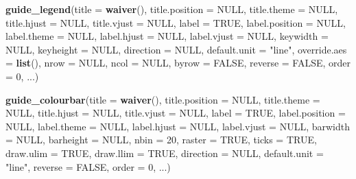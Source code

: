 \documentclass[]{book}
\newenvironment{Shaded}{\begin{snugshade}}{\end{snugshade}}
\newcommand{\KeywordTok}[1]{\textcolor[rgb]{0.13,0.29,0.53}{\textbf{#1}}}
\newcommand{\DataTypeTok}[1]{\textcolor[rgb]{0.13,0.29,0.53}{#1}}
\newcommand{\DecValTok}[1]{\textcolor[rgb]{0.00,0.00,0.81}{#1}}
\newcommand{\StringTok}[1]{\textcolor[rgb]{0.31,0.60,0.02}{#1}}
\newcommand{\OtherTok}[1]{\textcolor[rgb]{0.56,0.35,0.01}{#1}}
\newcommand{\NormalTok}[1]{#1}
\begin{document}
\begin{Shaded}
\begin{Highlighting}[]
\KeywordTok{guide_legend}\NormalTok{(}\DataTypeTok{title =} \KeywordTok{waiver}\NormalTok{(), }\DataTypeTok{title.position =} \OtherTok{NULL}\NormalTok{, }\DataTypeTok{title.theme =} \OtherTok{NULL}\NormalTok{,}
             \DataTypeTok{title.hjust =} \OtherTok{NULL}\NormalTok{, }\DataTypeTok{title.vjust =} \OtherTok{NULL}\NormalTok{, }\DataTypeTok{label =} \OtherTok{TRUE}\NormalTok{,}
             \DataTypeTok{label.position =} \OtherTok{NULL}\NormalTok{, }\DataTypeTok{label.theme =} \OtherTok{NULL}\NormalTok{, }\DataTypeTok{label.hjust =} \OtherTok{NULL}\NormalTok{,}
             \DataTypeTok{label.vjust =} \OtherTok{NULL}\NormalTok{, }\DataTypeTok{keywidth =} \OtherTok{NULL}\NormalTok{, }\DataTypeTok{keyheight =} \OtherTok{NULL}\NormalTok{,}
             \DataTypeTok{direction =} \OtherTok{NULL}\NormalTok{, }\DataTypeTok{default.unit =} \StringTok{"line"}\NormalTok{, }\DataTypeTok{override.aes =} \KeywordTok{list}\NormalTok{(),}
             \DataTypeTok{nrow =} \OtherTok{NULL}\NormalTok{, }\DataTypeTok{ncol =} \OtherTok{NULL}\NormalTok{, }\DataTypeTok{byrow =} \OtherTok{FALSE}\NormalTok{, }\DataTypeTok{reverse =} \OtherTok{FALSE}\NormalTok{, }\DataTypeTok{order =} \DecValTok{0}\NormalTok{, ...)}

\KeywordTok{guide_colourbar}\NormalTok{(}\DataTypeTok{title =} \KeywordTok{waiver}\NormalTok{(), }\DataTypeTok{title.position =} \OtherTok{NULL}\NormalTok{, }\DataTypeTok{title.theme =} \OtherTok{NULL}\NormalTok{,}
                \DataTypeTok{title.hjust =} \OtherTok{NULL}\NormalTok{, }\DataTypeTok{title.vjust =} \OtherTok{NULL}\NormalTok{, }\DataTypeTok{label =} \OtherTok{TRUE}\NormalTok{,}
                \DataTypeTok{label.position =} \OtherTok{NULL}\NormalTok{, }\DataTypeTok{label.theme =} \OtherTok{NULL}\NormalTok{, }\DataTypeTok{label.hjust =} \OtherTok{NULL}\NormalTok{,}
                \DataTypeTok{label.vjust =} \OtherTok{NULL}\NormalTok{, }\DataTypeTok{barwidth =} \OtherTok{NULL}\NormalTok{, }\DataTypeTok{barheight =} \OtherTok{NULL}\NormalTok{, }\DataTypeTok{nbin =} \DecValTok{20}\NormalTok{,}
                \DataTypeTok{raster =} \OtherTok{TRUE}\NormalTok{, }\DataTypeTok{ticks =} \OtherTok{TRUE}\NormalTok{, }\DataTypeTok{draw.ulim =} \OtherTok{TRUE}\NormalTok{, }\DataTypeTok{draw.llim =} \OtherTok{TRUE}\NormalTok{,}
                \DataTypeTok{direction =} \OtherTok{NULL}\NormalTok{, }\DataTypeTok{default.unit =} \StringTok{"line"}\NormalTok{, }\DataTypeTok{reverse =} \OtherTok{FALSE}\NormalTok{, }\DataTypeTok{order =} \DecValTok{0}\NormalTok{, ...)}
\end{Highlighting}
\end{Shaded}
\end{document}
